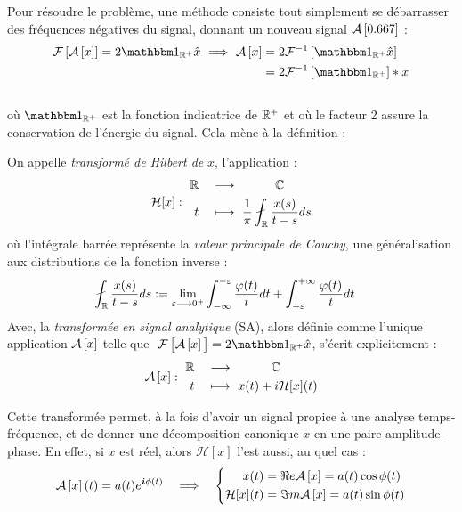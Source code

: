 Pour résoudre le problème, une méthode consiste tout simplement se débarrasser des fréquences négatives du signal, donnant un nouveau signal $\SA{\x}$ :
\begin{align*}
	\Fou{\SA{x}}= 2\one_{\R^+}\fou{x}\ \Lr\ \SA{x} &= 2\iFou{\one_{\R^+}\fou{x}} \\
	&= 2 \iFou{\one_{\R^+}} * x
\end{align*}
\\
où $\one_{\R^+}$ est la fonction indicatrice de $\mathbb{R}^+$ et où le facteur 2 assure la conservation de l'énergie du signal. Cela mène à la définition :
\\
\begin{definition}\label{def:transfo_sa&hilbert}
	On appelle \emph{transformé de Hilbert de} $x$, l'application :
	\begin{equation}\label{eq:transfo_Hilb}
		\mathcal{H}[x] :\ \begin{aligned} 
			\R \quad &\lr\qquad\quad \C \\	
			t\quad &\longmapsto\ \frac{1}{\pi}\fint_\R \frac{x(s)}{t-s}ds %
		\end{aligned}
	\end{equation}
	où l'intégrale barrée représente la \emph{valeur principale de Cauchy}, une généralisation aux distributions de la fonction inverse :
	\begin{align*}
		\fint_\R \frac{x(s)}{t-s}ds &\defeq \lim_{\varepsilon\lr0^+} \int_{-\infty}^{-\varepsilon} \frac{\varphi(t)}{t}dt + \int_{+\varepsilon}^{+\infty} \frac{\varphi(t)}{t}dt 
	\end{align*}
	Avec, la \emph{transformée en signal analytique} (SA), alors définie comme l'unique application $\mathcal{A}\left[x\right]$ telle que $\ \Fou{\SA{x}\big.}= 2\one_{\R^+}\fou{x}$, s'écrit explicitement :
	\begin{equation}\label{eq:transfo_SA}
		\SA{x} :\ \begin{aligned} 
			\R \quad &\lr\qquad\quad \C \\	
			t\quad &\longmapsto\ x(t) + i\mathcal{H}[x](t) %
		\end{aligned}
	\end{equation}
\end{definition}
\skipl

Cette transformée permet, à la fois d'avoir un signal propice à une analyse temps-fréquence, et de donner une décomposition canonique $x$ en une paire amplitude-phase. En effet, si $x$ est réel, alors $\mathcal{H}[x]$ l'est aussi, au quel cas :
\[\mathcal{A}\left[x\right](t) = a(t)e^{\boldsymbol{i} \phi(t)}\quad \Longrightarrow\quad \left\{\begin{aligned}x(t) &= \Re e \mathcal{A}\left[x\right] = a(t) \cos\phi(t) \\ \mathcal{H}[x](t) &= \Im m \mathcal{A}\left[x\right] = a(t) \sin\phi(t)
\end{aligned}\right.\]
\\




